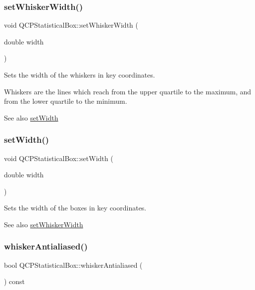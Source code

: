 \subsubsection{\texorpdfstring{set\+Whisker\+Width()}{setWhiskerWidth()}}
{\footnotesize\ttfamily void Q\+C\+P\+Statistical\+Box\+::set\+Whisker\+Width (\begin{DoxyParamCaption}\item[{double}]{width }\end{DoxyParamCaption})}

Sets the width of the whiskers in key coordinates.

Whiskers are the lines which reach from the upper quartile to the maximum, and from the lower quartile to the minimum.

\begin{DoxySeeAlso}{See also}
\hyperlink{class_q_c_p_statistical_box_a0b62775bd67301b1eba5c785f2b26f14}{set\+Width} 
\end{DoxySeeAlso}
\mbox{\label{class_q_c_p_statistical_box_a0b62775bd67301b1eba5c785f2b26f14}} 
\subsubsection{\texorpdfstring{set\+Width()}{setWidth()}}
{\footnotesize\ttfamily void Q\+C\+P\+Statistical\+Box\+::set\+Width (\begin{DoxyParamCaption}\item[{double}]{width }\end{DoxyParamCaption})}

Sets the width of the boxes in key coordinates.

\begin{DoxySeeAlso}{See also}
\hyperlink{class_q_c_p_statistical_box_adf378812446bd66f34d1f7f293d991cd}{set\+Whisker\+Width} 
\end{DoxySeeAlso}
\mbox{\label{class_q_c_p_statistical_box_a2015a8ea758cf65a41d4a6c52a20696b}} 
\subsubsection{\texorpdfstring{whisker\+Antialiased()}{whiskerAntialiased()}}
{\footnotesize\ttfamily bool Q\+C\+P\+Statistical\+Box\+::whisker\+Antialiased (\begin{DoxyParamCaption}{ }\end{DoxyParamCaption}) const\hspace{0.3cm}{\ttfamily [inline]}}


